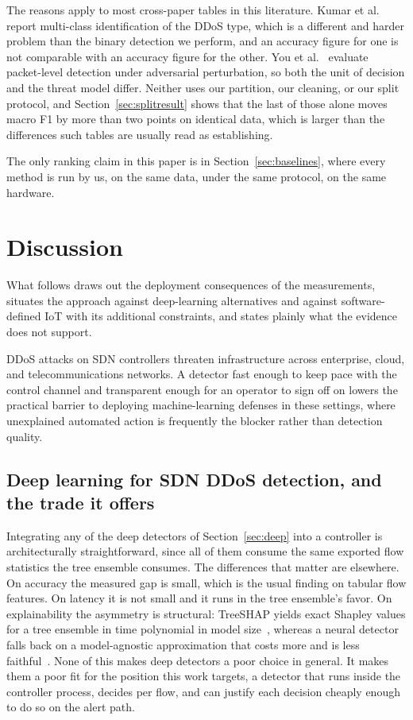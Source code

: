 \documentclass{ieeeaccess}
\begin{document}
The reasons apply to most cross-paper tables in this literature. Kumar et
al.~\cite{kumar2026meta} report multi-class identification of the DDoS type,
which is a different and harder problem than the binary detection we perform, and
an accuracy figure for one is not comparable with an accuracy figure for the
other. You et al.~\cite{you2026plaa} evaluate packet-level detection under
adversarial perturbation, so both the unit of decision and the threat model
differ. Neither uses our partition, our cleaning, or our split protocol, and
Section~\ref{sec:splitresult} shows that the last of those alone moves macro F1
by more than two points on identical data, which is larger than the differences
such tables are usually read as establishing.

The only ranking claim in this paper is in Section~\ref{sec:baselines}, where
every method is run by us, on the same data, under the same protocol, on the same
hardware.

\section{Discussion}
\label{sec:discussion}

What follows draws out the deployment consequences of the measurements, situates the approach against deep-learning alternatives and against software-defined IoT with its additional constraints, and states plainly what the evidence does not support.

DDoS attacks on SDN controllers threaten infrastructure across enterprise, cloud, and telecommunications networks. A detector fast enough to keep pace with the control channel and transparent enough for an operator to sign off on lowers the practical barrier to deploying machine-learning defenses in these settings, where unexplained automated action is frequently the blocker rather than detection quality.

\subsection{Deep learning for SDN DDoS detection, and the trade it offers}
\label{sec:dl-discussion}
Integrating any of the deep detectors of Section~\ref{sec:deep} into a controller
is architecturally straightforward, since all of them consume the same exported
flow statistics the tree ensemble consumes. The differences that matter are
elsewhere. On accuracy the measured gap is small, which is the usual finding on
tabular flow features. On latency it is not small and it runs in the tree
ensemble's favor. On explainability the asymmetry is structural: TreeSHAP yields
exact Shapley values for a tree ensemble in time polynomial in model
size~\cite{lundberg2020treeshap}, whereas a neural detector falls back on a
model-agnostic approximation that costs more and is less
faithful~\cite{warnecke2020evaluating}. None of this makes deep detectors a poor
choice in general. It makes them a poor fit for the position this work targets, a
detector that runs inside the controller process, decides per flow, and can
justify each decision cheaply enough to do so on the alert path.
\end{document}
